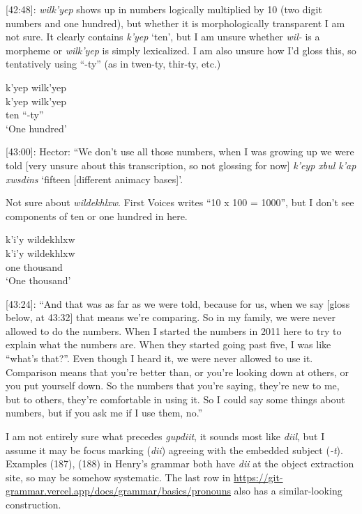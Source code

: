 [42:48]: \textit{wilk'yep} shows up in numbers logically multiplied by 10 (two digit numbers and one hundred), but whether it is morphologically transparent I am not sure. It clearly contains \textit{k'yep} `ten', but I am unsure whether \textit{wil-} is a morpheme or \textit{wilk'yep} is simply lexicalized. I am also unsure how I'd gloss this, so tentatively using ``-ty'' (as in twen-ty, thir-ty, etc.)

\begin{exe}
    \ex \glll k'yep wilk'yep \\
    k'yep wilk'yep \\
    ten ``-ty''\\
    `One hundred'
\end{exe}

[43:00]: Hector: ``We don't use all those numbers, when I was growing up we were told [very unsure about this transcription, so not glossing for now] \textit{k'eyp xbul k'ap xwsdins} `fifteen [different animacy bases]'.

Not sure about \textit{wildekhlxw}. First Voices writes ``10 x 100 = 1000'', but I don't see components of ten or one hundred in here.

\begin{exe}
    \ex \glll k'i'y wildekhlxw \\
    k'i'y wildekhlxw \\
    one thousand\\
    `One thousand'
\end{exe}

[43:24]: ``And that was as far as we were told, because for us, when we say [gloss below, at 43:32] that means we're comparing. So in my family, we were never allowed to do the numbers. When I started the numbers in 2011 here to try to explain what the numbers are. When they started going past five, I was like ``what's that?''. Even though I heard it, we were never allowed to use it. Comparison means that you're better than, or you're looking down at others, or you put yourself down. So the numbers that you're saying, they're new to me, but to others, they're comfortable in using it. So I could say some things about numbers, but if you ask me if I use them, no.''

I am not entirely sure what precedes \textit{gupdiit}, it sounds most like \textit{diil}, but I assume it may be focus marking (\textit{dii}) agreeing with the embedded subject (\textit{-t}). Examples (187), (188) in Henry's grammar both have \textit{dii} at the object extraction site, so may be somehow systematic. The last row in \url{https://git-grammar.vercel.app/docs/grammar/basics/pronouns} also has a similar-looking construction.

